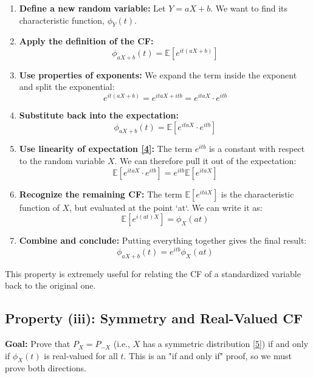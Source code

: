 \documentclass[11pt,a4paper]{article}
\begin{document}
\begin{enumerate}
    \item \textbf{Define a new random variable:} Let $Y = aX + b$. We want to find its characteristic function, $\phi_Y(t)$.
    \item \textbf{Apply the definition of the CF:}
    \[ \phi_{aX+b}(t) = \mathbb{E}[e^{it(aX+b)}] \]
    \item \textbf{Use properties of exponents:} We expand the term inside the exponent and split the exponential:
    \[ e^{it(aX+b)} = e^{itaX + itb} = e^{itaX} \cdot e^{itb} \]
    \item \textbf{Substitute back into the expectation:}
    \[ \phi_{aX+b}(t) = \mathbb{E}[e^{itaX} \cdot e^{itb}] \]
    \item \textbf{Use linearity of expectation \hyperlink{note4}{[4]}:} The term $e^{itb}$ is a constant with respect to the random variable $X$. We can therefore pull it out of the expectation:
    \[ \mathbb{E}[e^{itaX} \cdot e^{itb}] = e^{itb} \mathbb{E}[e^{itaX}] \]
    \item \textbf{Recognize the remaining CF:} The term $\mathbb{E}[e^{itaX}]$ is the characteristic function of $X$, but evaluated at the point `at`. We can write it as:
    \[ \mathbb{E}[e^{i(at)X}] = \phi_X(at) \]
    \item \textbf{Combine and conclude:} Putting everything together gives the final result:
    \[ \phi_{aX+b}(t) = e^{itb} \phi_X(at) \]
\end{enumerate}
This property is extremely useful for relating the CF of a standardized variable back to the original one.

\subsection{Property (iii): Symmetry and Real-Valued CF}
\textbf{Goal:} Prove that $P_X = P_{-X}$ (i.e., $X$ has a symmetric distribution \hyperlink{note5}{[5]}) if and only if $\phi_X(t)$ is real-valued for all $t$. This is an "if and only if" proof, so we must prove both directions.
\end{document}
